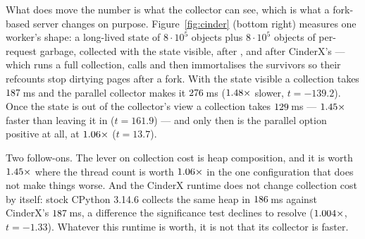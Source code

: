 What does move the number is what the collector can see, which is what a fork-based server
changes on purpose. Figure~\ref{fig:cinder} (bottom right) measures one worker's shape: a
long-lived state of $8\cdot10^5$ objects plus $8\cdot10^5$ objects of per-request garbage,
collected with the state visible, after , and after CinderX's
 --- which runs a full collection, calls  and then
immortalises the survivors so their refcounts stop dirtying pages after a fork. With the state
visible a collection takes $\meas{med:b6_gcscale-fork_cinderx:gc_collect/fork_cinderx/state_visible_serial:ms}{187}$\,ms and the parallel collector makes it $\meas{med:b6_gcscale-fork_cinderx:gc_collect/fork_cinderx/state_visible_par6:ms}{276}$\,ms
($\meas{ratio:b6_gcscale-fork_cinderx:gc_collect/fork_cinderx/state_visible_par6|b6_gcscale-fork_cinderx:gc_collect/fork_cinderx/state_visible_serial}{1.48}\times$ slower, $t=-139.2$). Once the state is out of the collector's view a collection
takes $\meas{med:b6_gcscale-fork_cinderx:gc_collect/fork_cinderx/immortal_serial:ms}{129}$\,ms --- $\meas{ratio:b6_gcscale-fork_cinderx:gc_collect/fork_cinderx/state_visible_serial|b6_gcscale-fork_cinderx:gc_collect/fork_cinderx/immortal_serial}{1.45}\times$ faster than leaving it in ($t=161.9$) --- and only then is the
parallel option positive at all, at $\meas{ratio:b6_gcscale-fork_cinderx:gc_collect/fork_cinderx/immortal_serial|b6_gcscale-fork_cinderx:gc_collect/fork_cinderx/immortal_par6}{1.06}\times$ ($t=13.7$).

Two follow-ons. The lever on collection cost is heap composition, and it is worth
$\meas{ratio:b6_gcscale-fork_cinderx:gc_collect/fork_cinderx/state_visible_serial|b6_gcscale-fork_cinderx:gc_collect/fork_cinderx/immortal_serial}{1.45}\times$ where the thread count is worth $\meas{ratio:b6_gcscale-fork_cinderx:gc_collect/fork_cinderx/immortal_serial|b6_gcscale-fork_cinderx:gc_collect/fork_cinderx/immortal_par6}{1.06}\times$ in the one configuration that does
not make things worse. And the CinderX runtime does not change collection cost by itself: stock
CPython 3.14.6 collects the same heap in $\meas{med:b6_gcscale-stock:gc_collect/stock/state_visible_serial:ms}{186}$\,ms against CinderX's $\meas{med:b6_gcscale-fork_cinderx:gc_collect/fork_cinderx/state_visible_serial:ms}{187}$\,ms, a difference
the significance test declines to resolve ($\meas{ratio:b6_gcscale-fork_cinderx:gc_collect/fork_cinderx/state_visible_serial|b6_gcscale-stock:gc_collect/stock/state_visible_serial}{1.004}\times$, $t=-1.33$). Whatever this runtime is
worth, it is not that its collector is faster.

